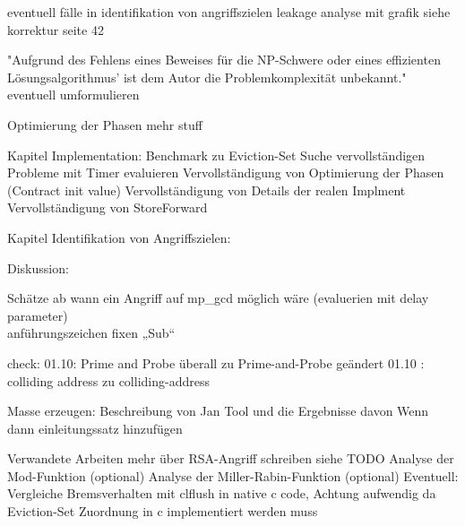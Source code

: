 eventuell fälle in identifikation von angriffszielen leakage analyse mit grafik siehe korrektur seite 42

"Aufgrund des Fehlens eines Beweises für die NP-Schwere oder eines effizienten Lösungsalgorithmus' ist dem Autor die Problemkomplexität unbekannt."
eventuell umformulieren

Optimierung der Phasen mehr stuff


Kapitel Implementation:
Benchmark zu Eviction-Set Suche vervollständigen
Probleme mit Timer evaluieren
Vervollständigung von Optimierung der Phasen (Contract init value)
Vervollständigung von Details der realen Implment
Vervollständigung von StoreForward

Kapitel Identifikation von Angriffszielen:


Diskussion:


Schätze ab wann ein Angriff auf mp_gcd möglich wäre (evaluerien mit delay parameter)\\




anführungszeichen fixen „Sub“





check: 01.10: Prime and Probe überall zu Prime-and-Probe geändert
01.10 : colliding address zu colliding-address

Masse erzeugen:
Beschreibung von Jan Tool und die Ergebnisse davon
Wenn dann einleitungssatz hinzufügen

Verwandete Arbeiten mehr über RSA-Angriff schreiben siehe TODO
Analyse der Mod-Funktion (optional)
Analyse der Miller-Rabin-Funktion (optional)
Eventuell: Vergleiche Bremsverhalten mit clflush in native c code,
Achtung aufwendig da Eviction-Set Zuordnung in c implementiert werden muss



